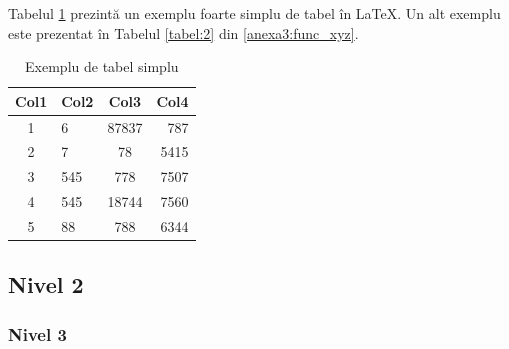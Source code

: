 Tabelul \ref{tabel:tab_simplu} prezintă un exemplu foarte simplu de tabel în \LaTeX. Un alt exemplu este prezentat în Tabelul \ref{tabel:2} din \ref{anexa3:func_xyz}.

\begin{table}[ht]
    \centering
    \caption{Exemplu de tabel simplu}
    \label{tabel:tab_simplu}
    \begin{tabular}{||c l c r||} 
        \hline
        \textbf{Col1} & \textbf{Col2} & \textbf{Col3} & \textbf{Col4} \\
        \hline\hline
        1 & 6 & 87837 & 787 \\ 
        2 & 7 & 78 & 5415 \\
        3 & 545 & 778 & 7507 \\
        4 & 545 & 18744 & 7560 \\
        5 & 88 & 788 & 6344 \\
        \hline
    \end{tabular}
\end{table}

\subsection{Nivel 2}
\label{cap:cap4:nivel1:nivel2}

\subsubsection{Nivel 3}
\label{cap:cap4:nivel1:nivel2:nivel3}

\textcolor{gray}{\lipsum}

\textcolor{gray}{\lipsum}

\textcolor{gray}{\lipsum}
